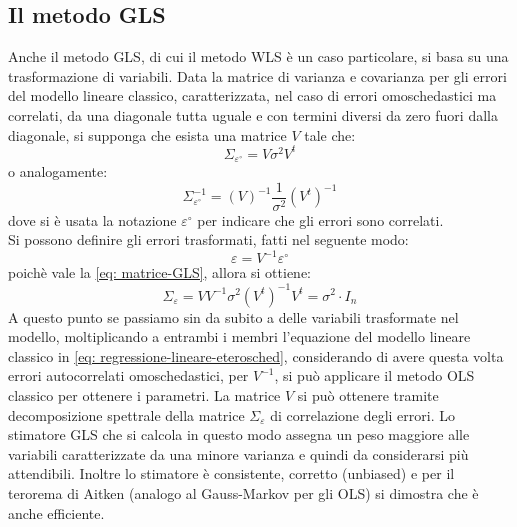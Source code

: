 \subsection{Il metodo GLS}
Anche il metodo GLS, di cui il metodo WLS è un caso particolare, si basa su una trasformazione di variabili.
Data la matrice di varianza e covarianza per gli errori del modello lineare classico, caratterizzata, nel caso di errori omoschedastici ma correlati, da una diagonale tutta uguale e con termini diversi da zero fuori dalla diagonale, si supponga che esista una matrice $V$ tale che:
\begin{equation}
\Sigma_{\varepsilon^\circ} = V \sigma^2 V^t
\label{eq: matrice-GLS}
\end{equation}
o analogamente:
\begin{equation}
\Sigma_{\varepsilon^\circ}^{-1} = (V)^{-1} \frac{1}{\sigma^2} (V^t)^{-1}
\end{equation}
dove si è usata la notazione $\varepsilon^\circ$ per indicare che gli errori sono correlati.\\
Si possono definire gli errori trasformati, fatti nel seguente modo:
\begin{equation}
\varepsilon = V^{-1} \varepsilon^\circ
\end{equation}
poichè vale la \eqref{eq: matrice-GLS}, allora si ottiene:
\begin{equation}
\Sigma_\varepsilon = VV^{-1} \sigma^2 (V^t)^{-1}V^t = \sigma^2 \cdot I_n
\end{equation}
A questo punto se passiamo sin da subito a delle variabili trasformate nel modello, moltiplicando a entrambi i membri l'equazione del modello lineare classico in \eqref{eq: regressione-lineare-eterosched}, considerando di avere questa volta errori autocorrelati omoschedastici, per $V^{-1}$, si può applicare il metodo OLS classico per ottenere i parametri.
La matrice $V$ si può ottenere tramite decomposizione spettrale della matrice $\Sigma_\varepsilon$ di correlazione degli errori.
Lo stimatore GLS che si calcola in questo modo assegna un peso maggiore alle variabili caratterizzate da una minore varianza e quindi da considerarsi più attendibili. Inoltre lo stimatore è consistente, corretto (unbiased) e per il terorema di Aitken (analogo al Gauss-Markov per gli OLS) si dimostra che è anche efficiente.
